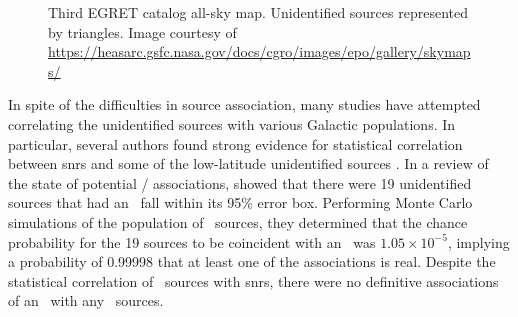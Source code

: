 \begin{figure}[h!]%
	\centering
	\caption[Third EGRET catalog all-sky map.]{Third EGRET catalog all-sky map. Unidentified sources represented by triangles. Image courtesy of \url{https://heasarc.gsfc.nasa.gov/docs/cgro/images/epo/gallery/skymaps/}}
	\label{fig:3EGSky} 
\end{figure}

In spite of the difficulties in \egret{} source association, many studies have attempted correlating the unidentified \egret{} sources with various Galactic populations. In particular, several authors found strong evidence for statistical correlation between \glspl{snr} and some of the low-latitude unidentified sources \citep{Sturner95, Esposito96, Romero99}. In a review of the state of potential \snr{} /  \egret{} associations, \cite{Torres03} showed that there were 19 unidentified \egret{} sources that had an \snr~fall within its 95\% error box. Performing Monte Carlo simulations of the population of  \egret~sources, they determined that the chance probability for the 19 sources to be coincident with an \snr~was $1.05 \times 10^{-5}$, implying a probability of 0.99998 that at least one of the associations is real. Despite the statistical correlation of \egret~sources with \glspl{snr}, there were no definitive associations of an \snr~with any \egret~sources.

